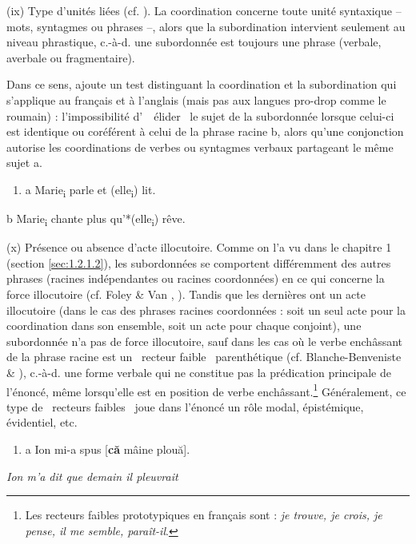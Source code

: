 (ix) Type d'unités liées (cf. \citet{Haspelmath2007}). La coordination concerne toute unité syntaxique -- mots, syntagmes ou phrases --, alors que la subordination intervient seulement au niveau phrastique, c.-à-d. une subordonnée est toujours une phrase (verbale, averbale ou fragmentaire). 

Dans ce sens, \citet{Piot1993} ajoute un test distinguant la coordination et la subordination qui s'applique au français et à l'anglais (mais pas aux langues pro-drop comme le roumain) : l'impossibilité d'~{\guillemotleft}~élider~{\guillemotright} le sujet de la subordonnée lorsque celui-ci est identique ou coréférent à celui de la phrase racine b, alors qu'une conjonction autorise les coordinations de verbes ou syntagmes verbaux partageant le même sujet a.


\begin{enumerate}
\item \label{bkm:Ref300266165}a  Marie\textsubscript{i} parle et (elle\textsubscript{i}) lit.  


\end{enumerate}
  b  Marie\textsubscript{i} chante plus qu'*(elle\textsubscript{i}) rêve. 

(x) Présence ou absence d'acte illocutoire. Comme on l'a vu dans le chapitre 1 (section \ref{sec:1.2.1.2}), les subordonnées se comportent différemment des autres phrases (racines indépendantes ou racines coordonnées) en ce qui concerne la force illocutoire (cf. Foley \& Van \citet{Valin1984}, \citet{Cristofaro2003}). Tandis que les dernières ont un acte illocutoire (dans le cas des phrases racines coordonnées : soit un seul acte pour la coordination dans son ensemble, soit un acte pour chaque conjoint), une subordonnée n'a pas de force illocutoire, sauf dans les cas où le verbe enchâssant de la phrase racine est un {\guillemotleft}~recteur faible~{\guillemotright} parenthétique (cf. Blanche-Benveniste \& \citet{Willems2007}), c.-à-d. une forme verbale qui ne constitue pas la prédication principale de l'énoncé, même lorsqu'elle est en position de verbe enchâssant.\footnote{Les recteurs faibles prototypiques en français sont : \textit{je trouve, je crois, je pense, il me semble, paraît-il}.} Généralement, ce type de {\guillemotleft}~recteurs faibles~{\guillemotright} joue dans l'énoncé un rôle modal, épistémique, évidentiel, etc.


\begin{enumerate}
\item a  Ion mi-a spus [\textbf{că} mâine plouă].


\end{enumerate}
{\itshape
Ion m'a dit que demain il pleuvrait}

